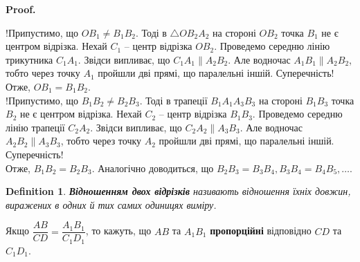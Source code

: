 \documentclass[a4paper, 10pt]{article}
\makeatletter
\def\qed{$\blacksquare$}
\theoremstyle{theoremdd}
\theoremstyle{theoremdd}
\theoremstyle{theoremdd}
\newtheorem{definition}[theorem]{Definition}
\theoremstyle{theoremdd}
\theoremstyle{theoremdd}
\theoremstyle{theoremdd}
\theoremstyle{theoremdd}
\theoremstyle{theoremdd}
\theoremstyle{theoremdd}
\renewenvironment{proof}[1][Proof.\\]{\par
\pushQED{\hfill \qed}%
\normalfont \topsep6\p@\@plus6\p@\relax
\trivlist
\item\relax
{\bfseries
#1\@addpunct{.}}\hspace\labelsep\ignorespaces
}{%
\popQED\endtrivlist\@endpefalse
}
\makeatother
\begin{document}
\begin{proof}
\begin{figure}[H]
\end{figure}
!Припустимо, що $OB_1 \neq B_1B_2$. Тоді в $\triangle OB_2A_2$ на стороні $OB_2$ точка $B_1$ не є центром відрізка. Нехай $C_1$ -- центр відрізка $OB_2$. Проведемо середню лінію трикутника $C_1A_1$. Звідси випливає, що $C_1A_1 \parallel A_2B_2$. Але водночас $A_1B_1 \parallel A_2B_2$, тобто через точку $A_1$ пройшли дві прямі, що паралельні іншій. Суперечність!
Отже, $OB_1 = B_1B_2$.
\bigskip \\
!Припустимо, що $B_1B_2 \neq B_2B_3$. Тоді в трапеції $B_1A_1A_3B_3$ на стороні $B_1B_3$ точка $B_2$ не є центром відрізка. Нехай $C_2$ -- центр відрізка $B_1B_3$. Проведемо середню лінію трапеції $C_2A_2$. Звідси випливає, що $C_2A_2 \parallel A_3B_3$. Але водночас $A_2B_2 \parallel A_3B_3$, тобто через точку $A_2$ пройшли дві прямі, що паралельні іншій. Суперечність!\\
Отже, $B_1B_2 = B_2B_3$. Аналогічно доводиться, що $B_2B_3 = B_3B_4, B_3B_4 = B_4B_5,\dots$.
\end{proof}

\begin{definition}
\textbf{Відношенням двох відрізків} називають відношення їхніх довжин, виражених в одних й тих самих одиницях виміру.
\end{definition}
Якщо $\dfrac{AB}{CD} = \dfrac{A_1B_1}{C_1D_1}$, то кажуть, що $AB$ та $A_1B_1$ \textbf{пропорційні} відповідно $CD$ та $C_1D_1$.
\end{document}
